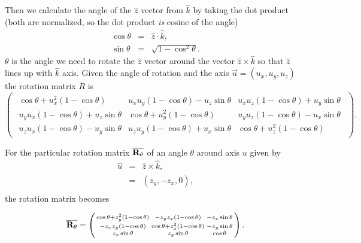 \documentclass{article}
\def\matrix#1{\overline{\bf{#1}}}
\begin{document}
Then we calculate the angle of the $\hat{z}$ vector from $\hat{k}$ by taking the dot product (both are normalized, so the dot product \textit{is} cosine of the angle)
\begin{eqnarray}
	\cos\theta &=& \hat{z}\cdot\hat{k},\\
	\sin\theta &=& \sqrt{1-\cos^2\theta}.
\end{eqnarray}
$\theta$ is the angle we need to rotate the $\hat{z}$ vector around the vector $\hat{z}\times\hat{k}$ so that $\hat{z}$ lines up with $\hat{k}$ axis. Given the angle of rotation and the axis $\vec{u} = (u_x,u_y,u_z)$ the rotation matrix $R$ is  
\begin{equation}
\begin{pmatrix}
\begin{smallmatrix}
	\cos\theta + u_x^2\left(1-\cos\theta\right) &  u_xu_y\left(1-\cos\theta\right) - u_z\sin\theta & u_xu_z\left(1-\cos\theta\right) + u_y\sin\theta \\
	u_yu_x\left(1-\cos\theta\right) + u_z\sin\theta & \cos\theta + u_y^2\left(1-\cos\theta\right) & u_yu_z\left(1-\cos\theta\right) - u_x\sin\theta \\
	u_zu_x\left(1-\cos\theta\right) - u_y\sin\theta & u_zu_y\left(1-\cos\theta\right) + u_x\sin\theta & \cos\theta + u_z^2\left(1-\cos\theta\right)
\end{smallmatrix}
\end{pmatrix}.
\end{equation}

For the particular rotation matrix $\matrix{R_\theta}$ of an angle $\theta$ around axis $u$ given by
\begin{eqnarray}
	\hat{u} &=& \hat{z}\times\hat{k},\\
			  &=& (z_y,-z_x,0),\\
\end{eqnarray}
the rotation matrix becomes

\begin{equation}
\matrix{R_\theta} = \begin{pmatrix}
\begin{smallmatrix}
	\cos\theta + z_y^2\left(1-\cos\theta\right) &  -z_yz_x\left(1-\cos\theta\right) & -z_x\sin\theta \\
	-z_xz_y\left(1-\cos\theta\right) & \cos\theta + z_x^2\left(1-\cos\theta\right) & - z_y\sin\theta \\
	z_x\sin\theta & z_y\sin\theta & \cos\theta
\end{smallmatrix}
\end{pmatrix}.
\end{equation}
\end{document}
